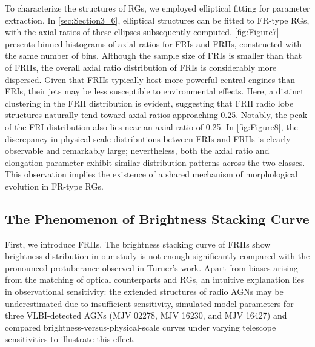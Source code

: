 \documentclass{aa}
\begin{document}
To characterize the structures of RGs, we employed elliptical fitting for parameter extraction. In \autoref{sec:Section3_6}, elliptical structures can be fitted to FR-type RGs, with the axial ratios of these ellipses subsequently computed. \autoref{fig:Figure7} presents binned histograms of axial ratios for FRIs and FRIIs, constructed with the same number of bins. Although the sample size of FRIs is smaller than that of FRIIs, the overall axial ratio distribution of FRIs is considerably more dispersed. Given that FRIIs typically host more powerful central engines than FRIs, their jets may be less susceptible to environmental effects. Here, a distinct clustering in the FRII distribution is evident, suggesting that FRII radio lobe structures naturally tend toward axial ratios approaching 0.25. Notably, the peak of the FRI distribution also lies near an axial ratio of 0.25. In \autoref{fig:Figure8}, the discrepancy in physical scale distributions between FRIs and FRIIs is clearly observable and remarkably large; nevertheless, both the axial ratio and elongation parameter exhibit similar distribution patterns across the two classes. This observation implies the existence of a shared mechanism of morphological evolution in FR-type RGs.




\subsection{The Phenomenon of Brightness Stacking Curve}\label{sec:Section5_3}

First, we introduce FRIIs. The brightness stacking curve of FRIIs show brightness distribution in our study is not enough significantly compared with the pronounced protuberance observed in Turner's work. Apart from biases arising from the matching of optical counterparts and RGs, an intuitive explanation lies in observational sensitivity: the extended structures of radio AGNs may be underestimated due to insufficient sensitivity, \cite{shabala_delayed_2017} simulated model parameters for three VLBI-detected AGNs (MJV 02278, MJV 16230, and MJV 16427) and compared brightness-versus-physical-scale curves under varying telescope sensitivities to illustrate this effect.
\end{document}
